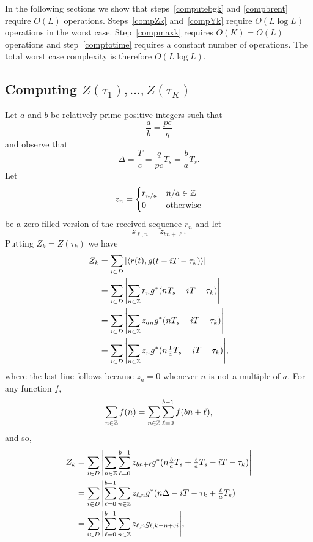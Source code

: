 \documentclass[journal]{IEEEtranTCOM}
\begin{document}
In the following sections we show that steps~\ref{computebgk} and \ref{compbrent} require $O(L)$ operations.  Steps~\ref{compZk} and~\ref{compYk} require $O(L\log L)$ operations in the worst case.  Step~\ref{compmaxk} requires $O(K) = O(L)$ operations and step~\ref{comptotime} requires a constant number of operations.  The total worst case complexity is therefore $O(L\log L)$.

\subsection{Computing $Z(\tau_1), \dots, Z(\tau_K)$}\label{sec:computing-ztau-grid}

Let $a$ and $b$ be relatively prime positive integers such that
\[
\frac{a}{b} = \frac{pc}{q}
\] 
and observe that
\begin{equation}\label{eq:deltaabc}
\Delta = \frac{T}{c} = \frac{q}{pc}T_s = \frac{b}{a} T_s.
\end{equation}
Let
\begin{equation} \label{eq:zzerofill}
z_n = \begin{cases} 
r_{n/a} & n/a \in \ints \\
0 & \text{otherwise}
\end{cases}
\end{equation}
be a zero filled version of the received sequence $r_n$ and let
\begin{equation} \label{eq:zln}
z_{\ell,n} = z_{bn + \ell}.
\end{equation}
Putting $Z_k = Z(\tau_k)$ we have
\begin{align}
Z_k  &= \sum_{i \in D} \abs{\dotprod{r(t)}{g(t - iT - \tau_k)}}  \label{eq:sumabsbkD1} \\
&= \sum_{i \in D} \abs{\sum_{n\in \ints} r_ng^*(n T_s - iT - \tau_k)}  \nonumber \\
&= \sum_{i \in D} \abs{\sum_{n\in\ints}z_{an}g^*(nT_s - iT - \tau_k)} \nonumber  \\
&= \sum_{i \in D} \abs{\sum_{n\in\ints}z_ng^*(n\tfrac{1}{a}T_s - iT - \tau_k)},  \nonumber
\end{align}
where the last line follows because $z_n = 0$ whenever $n$ is not a multiple of $a$.  For any function $f$, 
\[
\sum_{n\in{\mathbb Z}} f(n) = \sum_{n\in{\mathbb Z}}\sum_{\ell = 0}^{b-1}f(bn + \ell),
\]  
and so,
\begin{align*} 
Z_k &= \sum_{i \in D} {\left\vert \sum_{n\in{\mathbb Z}}\sum_{\ell = 0}^{b-1} z_{bn+\ell}g^*(n\tfrac{b}{a}T_s +  \tfrac{\ell}{a}T_s - iT - \tau_k) \right\vert} \\
&= \sum_{i \in D} {\left\vert  \sum_{\ell = 0}^{b-1} \sum_{n\in{\mathbb Z}} z_{\ell,n}g^*( n\Delta - iT - \tau_{k} + \tfrac{\ell}{a}T_s) \right\vert} \\
&= \sum_{i \in D} {\left\vert \sum_{\ell = 0}^{b-1} \sum_{n\in{\mathbb Z}}z_{\ell,n}g_{\ell,k-n+ci} \right\vert}, 
\end{align*}
\end{document}
